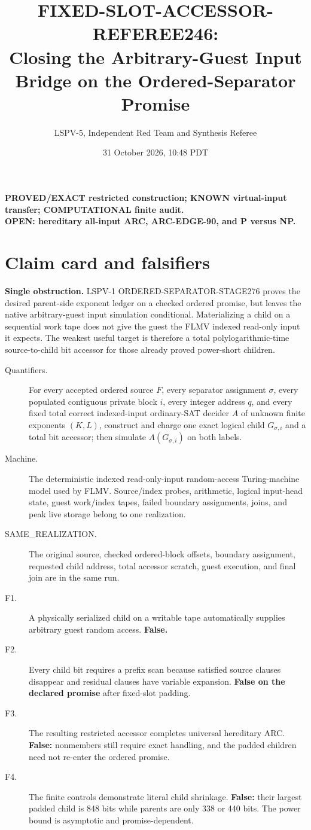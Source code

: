 \documentclass[11pt]{article}
\title{FIXED-SLOT-ACCESSOR-REFEREE246:\\Closing the Arbitrary-Guest Input Bridge on the Ordered-Separator Promise}
\author{LSPV-5, Independent Red Team and Synthesis Referee}
\date{31 October 2026, 10:48 PDT}
\begin{document}
\maketitle

\begin{center}
\textbf{PROVED/EXACT restricted construction; KNOWN virtual-input transfer; COMPUTATIONAL finite audit.}\\
\textbf{OPEN: hereditary all-input ARC, ARC-EDGE-90, and P versus NP.}
\end{center}

\section{Claim card and falsifiers}
\textbf{Single obstruction.}  LSPV-1 ORDERED-SEPARATOR-STAGE276 proves the desired parent-side exponent ledger on a checked ordered promise, but leaves the native arbitrary-guest input simulation conditional.  Materializing a child on a sequential work tape does not give the guest the FLMV indexed read-only input it expects.  The weakest useful target is therefore a total polylogarithmic-time source-to-child bit accessor for those already proved power-short children.

\begin{description}
\item[Quantifiers.] For every accepted ordered source $F$, every separator assignment $\sigma$, every populated contiguous private block $i$, every integer address $q$, and every fixed total correct indexed-input ordinary-SAT decider $A$ of unknown finite exponents $(K,L)$, construct and charge one exact logical child $G_{\sigma,i}$ and a total bit accessor; then simulate $A(G_{\sigma,i})$ on both labels.
\item[Machine.] The deterministic indexed read-only-input random-access Turing-machine model used by FLMV.  Source/index probes, arithmetic, logical input-head state, guest work/index tapes, failed boundary assignments, joins, and peak live storage belong to one realization.
\item[SAME\_REALIZATION.] The original source, checked ordered-block offsets, boundary assignment, requested child address, total accessor scratch, guest execution, and final join are in the same run.
\item[F1.] A physically serialized child on a writable tape automatically supplies arbitrary guest random access.  \textbf{False.}
\item[F2.] Every child bit requires a prefix scan because satisfied source clauses disappear and residual clauses have variable expansion.  \textbf{False on the declared promise} after fixed-slot padding.
\item[F3.] The resulting restricted accessor completes universal hereditary ARC.  \textbf{False:} nonmembers still require exact handling, and the padded children need not re-enter the ordered promise.
\item[F4.] The finite controls demonstrate literal child shrinkage.  \textbf{False:} their largest padded child is 848 bits while parents are only 338 or 440 bits.  The power bound is asymptotic and promise-dependent.
\end{description}
\end{document}
